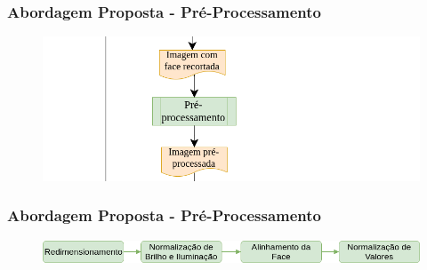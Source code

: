 \documentclass{beamer}
\begin{document}
\begin{frame}
\frametitle{Abordagem Proposta - Pré-Processamento}
\begin{figure}
\centering
\includegraphics[scale=0.37]{figuras/arquitetura_3.png}
\label{fig:arquitetura3}
\end{figure}
\end{frame}


\begin{frame}
 \frametitle{Abordagem Proposta - Pré-Processamento}

\begin{figure}
\centering
\includegraphics[scale=0.33]{figuras/PreProcessamentoMestrado.png}
\label{fig:preprocessamento}
\end{figure}

 
\end{frame}
\end{document}
